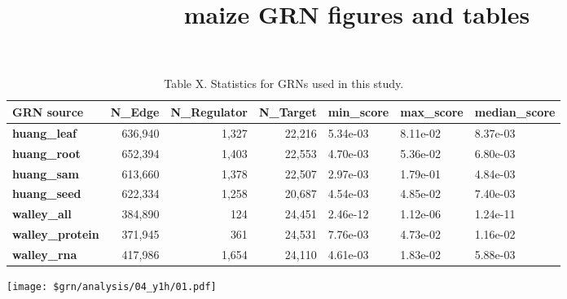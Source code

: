 \documentclass[11pt,]{article}
\title{maize GRN figures and tables  }
\author{}
\date{}
\let\origfigure\figure
\let\endorigfigure\endfigure
\renewenvironment{figure}[1][2] {
    \expandafter\origfigure\expandafter[H]
} {
    \endorigfigure
}
\begin{document}
    
%

{%
\setlength{\parindent}{0pt}
\thispagestyle{plain}
{\fontsize{18}{20}\selectfont\raggedright 
\maketitle  %

}

{
   \vskip 13.5pt\relax \normalsize\fontsize{11}{12} 
 

}

}






\vskip 6.5pt


\noindent  {}

\begin{table}[!h]

\caption{\label{tab:unnamed-chunk-1}Table X. Statistics for GRNs used in this study.}
\centering
\begin{tabular}[t]{>{\bfseries}lrrrlll}
\toprule
GRN source & N\_Edge & N\_Regulator & N\_Target & min\_score & max\_score & median\_score\\
\midrule
huang\_leaf & 636,940 & 1,327 & 22,216 & 5.34e-03 & 8.11e-02 & 8.37e-03\\
huang\_root & 652,394 & 1,403 & 22,553 & 4.70e-03 & 5.36e-02 & 6.80e-03\\
huang\_sam & 613,660 & 1,378 & 22,507 & 2.97e-03 & 1.79e-01 & 4.84e-03\\
huang\_seed & 622,334 & 1,258 & 20,687 & 4.54e-03 & 4.85e-02 & 7.40e-03\\
walley\_all & 384,890 & 124 & 24,451 & 2.46e-12 & 1.12e-06 & 1.24e-11\\
\addlinespace
walley\_protein & 371,945 & 361 & 24,531 & 7.76e-03 & 4.73e-02 & 1.16e-02\\
walley\_rna & 417,986 & 1,654 & 24,110 & 4.61e-03 & 1.83e-02 & 5.88e-03\\
\bottomrule
\end{tabular}
\end{table}

\pagebreak

\begin{figure}
\centering
\texttt{[image: \$grn/analysis/04\_y1h/01.pdf]}
\caption{Figure 1}
\end{figure}
\newpage
\singlespacing 
\end{document}
